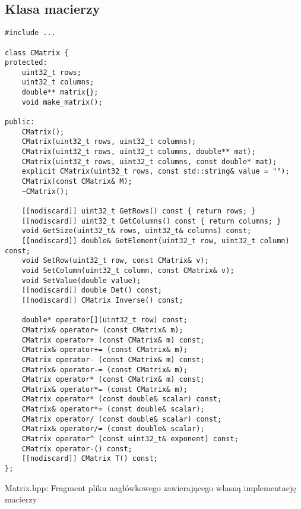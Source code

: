\subsection{Klasa macierzy} \label{sec:matrices}

\begin{listing}[htb]
\begin{verbatim}
#include ...

class CMatrix {
protected:
    uint32_t rows;
    uint32_t columns;
    double** matrix{};
    void make_matrix();

public:
    CMatrix();
    CMatrix(uint32_t rows, uint32_t columns);
    CMatrix(uint32_t rows, uint32_t columns, double** mat);
    CMatrix(uint32_t rows, uint32_t columns, const double* mat);
    explicit CMatrix(uint32_t rows, const std::string& value = "");
    CMatrix(const CMatrix& M);
    ~CMatrix();

    [[nodiscard]] uint32_t GetRows() const { return rows; }
    [[nodiscard]] uint32_t GetColumns() const { return columns; }
    void GetSize(uint32_t& rows, uint32_t& columns) const;
    [[nodiscard]] double& GetElement(uint32_t row, uint32_t column) const;
    void SetRow(uint32_t row, const CMatrix& v);
    void SetColumn(uint32_t column, const CMatrix& v);
    void SetValue(double value);
    [[nodiscard]] double Det() const;
    [[nodiscard]] CMatrix Inverse() const;

    double* operator[](uint32_t row) const;
    CMatrix& operator= (const CMatrix& m);
    CMatrix operator+ (const CMatrix& m) const;
    CMatrix& operator+= (const CMatrix& m);
    CMatrix operator- (const CMatrix& m) const;
    CMatrix& operator-= (const CMatrix& m);
    CMatrix operator* (const CMatrix& m) const;
    CMatrix& operator*= (const CMatrix& m);
    CMatrix operator* (const double& scalar) const;
    CMatrix& operator*= (const double& scalar);
    CMatrix operator/ (const double& scalar) const;
    CMatrix& operator/= (const double& scalar);
    CMatrix operator^ (const uint32_t& exponent) const;
    CMatrix operator-() const;
    [[nodiscard]] CMatrix T() const;
};
\end{verbatim}
\caption{Matrix.hpp: Fragment pliku nagłówkowego zawierającego własną implementację macierzy}
\label{lst:matrix_hpp}
\end{listing}

